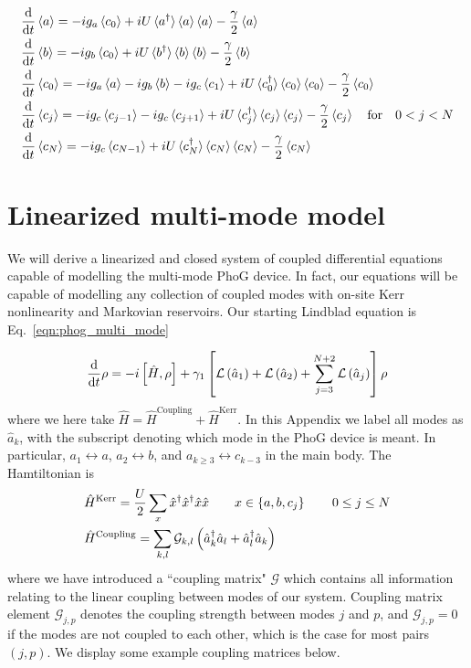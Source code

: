 \begin{align}
&\ddt \ev{a} = - i g_a \ev{c_0} + i U \ev*{a^\dagger} \ev{a} \ev{a} - \frac{\gamma}{2} \ev{a} \notag \\
%
&\ddt \ev{b} = - i g_b \ev{c_0} + i U \ev*{b^\dagger}\ev{b} \ev{b} - \frac{\gamma}{2} \ev{b} \notag \\
%
&\ddt \ev{c_0} = - i g_a \ev{a} - i g_b \ev{b} - i g_c \ev{c_1} + i U \ev*{c_0^\dagger} \ev{c_0} \ev{c_0} - \frac{\gamma}{2} \ev{c_0} \notag \\
%
&\ddt \ev{c_j} = - i g_c \ev{c_{j-1}} - i g_c \ev{c_{j+1}} + i U \ev*{c_j^\dagger} \ev{c_j} \ev{c_j} - \frac{\gamma}{2} \ev{c_j} \qq{for} 0< j < N \notag \\
%
&\ddt \ev{c_N} = - i g_c \ev{c_{N-1}} + i U \ev*{c_N^\dagger}\ev{c_N} \ev{c_N} - \frac{\gamma}{2} \ev{c_N}
\end{align}


\section{Linearized multi-mode model}\label{appendix:multi_mode_linear}
We will derive a linearized and closed system of coupled differential equations capable of modelling the multi-mode PhoG device. In fact, our equations will be capable of modelling any collection of coupled modes with on-site Kerr nonlinearity and Markovian reservoirs. Our starting Lindblad equation is Eq.~\ref{eqn:phog_multi_mode}

\begin{equation}
\frac{\mathrm{d}}{\mathrm{d}t} \rho = - i \left[\hat{H}, \rho\right] + \gamma_1 \left[\mathcal{L}\left(\hat{a}_1\right) + \mathcal{L}\left(\hat{a}_2\right) + \sum_{j=3}^{N+2} \mathcal{L}\left(\hat{a}_j\right) \right] \rho
\end{equation}
where we here take $\hat{H} = \hat{H}^{\text{Coupling}} + \hat{H}^{\text{Kerr}}$. In this Appendix we label all modes as $\hat{a}_k$, with the subscript denoting which mode in the PhoG device is meant. In particular, $a_1 \leftrightarrow a$, $a_2 \leftrightarrow b$, and $a_{k \ge 3} \leftrightarrow c_{k-3}$ in the main body. The Hamtiltonian is
\begin{align}
&\hat{H}^{\text{Kerr}} = \frac{U}{2} \sum_{x} \hat{x}^\dagger \hat{x}^\dagger \hat{x} \hat{x} \qq{} x \in \left\{a, b, c_j\right\} \qq{} 0 \le j \le N \notag \\
%
&\hat{H}^{\text{Coupling}} = \sum_{k, l} \mathcal{G}_{k, l}\left(\hat{a}_k^\dagger \hat{a}_l + \hat{a}_l^\dagger \hat{a}_k \right)
\end{align}
where we have introduced a ``coupling matrix" $\mathcal{G}$ which contains all information relating to the linear coupling between modes of our system. Coupling matrix element $\mathcal{G}_{j, p}$ denotes the coupling strength between modes $j$ and $p$, and $\mathcal{G}_{j, p} = 0$ if the modes are not coupled to each other, which is the case for most pairs $\left(j, p\right)$. We display some example coupling matrices below.
